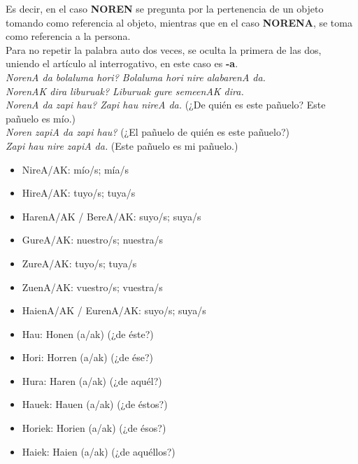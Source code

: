 \documentclass[11pt, a4paper]{article}
\begin{document}
\noindent Es decir, en el caso \textbf{NOREN} se pregunta por la pertenencia de un objeto tomando como referencia al objeto, mientras que en el caso \textbf{NORENA}, se toma como referencia a la persona.\\

\noindent Para no repetir la palabra auto dos veces, se oculta la primera de las dos, uniendo el artículo al interrogativo, en este caso es \textbf{-a}.\\

\indent \textit{NorenA da bolaluma hori? Bolaluma hori nire alabarenA da.}\\
\indent \textit{NorenAK dira liburuak? Liburuak gure semeenAK dira.}\\

\indent \textit{NorenA da zapi hau? Zapi hau nireA da.} (¿De quién es este pañuelo? Este pañuelo es mío.)\\
\indent \textit{Noren zapiA da zapi hau?} (¿El pañuelo de quién es este pañuelo?)\\
\indent \indent \textit{Zapi hau nire zapiA da.} (Este pañuelo es mi pañuelo.)

\begin{multicols}{2}
\begin{itemize}
\item NireA/AK: mío/s; mía/s
\item HireA/AK: tuyo/s; tuya/s
\item HarenA/AK / BereA/AK: suyo/s; suya/s\\
\item GureA/AK: nuestro/s; nuestra/s
\item ZureA/AK: tuyo/s; tuya/s
\item ZuenA/AK: vuestro/s; vuestra/s
\item HaienA/AK / EurenA/AK: suyo/s; suya/s
\end{itemize}
\end{multicols}
\vspace{0,2cm}
\begin{multicols}{2}
\begin{itemize}
\item Hau: Honen (a/ak) (¿de éste?)
\item Hori: Horren (a/ak) (¿de ése?)
\item Hura: Haren (a/ak) (¿de aquél?)
\item Hauek: Hauen (a/ak) (¿de éstos?)
\item Horiek: Horien (a/ak) (¿de ésos?)
\item Haiek: Haien (a/ak) (¿de aquéllos?)
\end{itemize}
\end{multicols}
\end{document}
